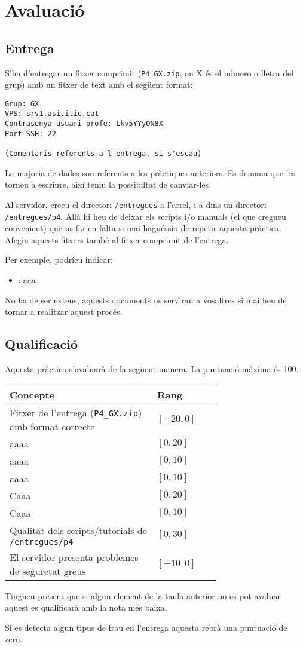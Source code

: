 \documentclass{practicaitic}
\begin{document}
\section{Avaluació}
\subsection{Entrega}
\label{sec:entrega}

S'ha d'entregar un fitxer comprimit (\texttt{P4\_GX.zip}, on X és el número o 
lletra del grup) amb un fitxer de text amb el següent format:

\begin{verbatim}
Grup: GX
VPS: srv1.asi.itic.cat
Contrasenya usuari profe: Lkv5YYyON8X
Port SSH: 22

(Comentaris referents a l'entrega, si s'escau)
\end{verbatim}

La majoria de dades son referents a les pràctiques anteriors. Es demana
que les torneu a escriure, així teniu la possibiltat de canviar-les.

Al servidor, creeu el directori \texttt{/entregues} a l'arrel, i a dins un
directori \texttt{/entregues/p4}. Allà hi heu de deixar els scripts i/o manuals
(el que cregueu convenient) que us farien falta si mai haguéssiu de repetir
aquesta pràctica. Afegiu aquests fitxers també al fitxer comprimit de l'entrega.

Per exemple, podríeu indicar:
\begin{itemize}
  \item aaaa
\end{itemize}

No ha de ser extens; aquests documents us serviran a vosaltres si mai heu de
tornar a realitzar aquest procés.

\subsection{Qualificació}

Aquesta pràctica s'avaluarà de la següent manera. La puntuació màxima és 100.

\begin{center}%
  \begin{tabular}{p{0.7\linewidth} l}
  \hline
  Concepte & Rang \\ \hline
  Fitxer de l'entrega (\texttt{P4\_GX.zip}) amb format correcte & $[-20, 0]$ \\
  aaaa & $[0, 20]$ \\
  aaaa & $[0, 10]$ \\
  aaaa & $[0, 10]$ \\
  Caaa & $[0, 20]$ \\
  Caaa & $[0, 10]$ \\
  Qualitat dels scripts/tutorials de \texttt{/entregues/p4} & $[0,30]$ \\
  El servidor presenta problemes de seguretat greus & $[-10,0]$ \\
  \hline
  \end{tabular}
\end{center}

Tingueu present que si algun element de la taula anterior no es pot avaluar
aquest es qualificarà amb la nota més baixa.

Si es detecta algun tipus de frau en l'entrega aquesta rebrà una puntuació de zero.
\end{document}
